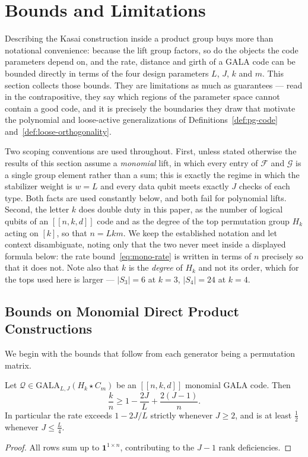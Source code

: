 \section{Bounds and Limitations}\label{sec:bounds}

Describing the Kasai construction inside a product group buys more than notational convenience: because the lift group factors, so do the objects the code parameters depend on, and the rate, distance and girth of a GALA code can be bounded directly in terms of the four design parameters $L$, $J$, $k$ and $m$. This section collects those bounds. They are limitations as much as guarantees --- read in the contrapositive, they say which regions of the parameter space cannot contain a good code, and it is precisely the boundaries they draw that motivate the polynomial and loose-active generalizations of Definitions~\ref{def:pg-code} and~\ref{def:loose-orthogonality}.

Two scoping conventions are used throughout. First, unless stated otherwise the results of this section assume a \emph{monomial} lift, in which every entry of $\mathcal F$ and $\mathcal G$ is a single group element rather than a sum; this is exactly the regime in which the stabilizer weight is $w = L$ and every data qubit meets exactly $J$ checks of each type. Both facts are used constantly below, and both fail for polynomial lifts. Second, the letter $k$ does double duty in this paper, as the number of logical qubits of an $[[n,k,d]]$ code and as the degree of the top permutation group $H_k$ acting on $[k]$, so that $n = Lkm$. We keep the established notation and let context disambiguate, noting only that the two never meet inside a displayed formula below: the rate bound~\eqref{eq:mono-rate} is written in terms of $n$ precisely so that it does not. Note also that $k$ is the \emph{degree} of $H_k$ and not its order, which for the tops used here is larger --- $|S_3| = 6$ at $k=3$, $|S_4| = 24$ at $k=4$.

\subsection{Bounds on Monomial Direct Product Constructions}\label{ssec:mono-bounds}

We begin with the bounds that follow from each generator being a permutation matrix.

\begin{proposition}\label{prop:rate-bound}
Let $\mathcal Q\in \mathrm{GALA}_{L,J}(H_k\star C_m)$ be an $[[n,k,d]]$ monomial GALA code. Then
\begin{equation}\label{eq:mono-rate}
    \frac{k}{n} \geq 1-\frac{2J}{L} + \frac{2(J-1)}{n}.
\end{equation}
In particular the rate exceeds $1-2J/L$ strictly whenever $J\geq2$, and is at least $\tfrac12$ whenever $J\leq \tfrac L4$.
\end{proposition}
\begin{proof}
    All rows sum up to $\textbf{1}^{1\times n}$, contributing to the $J-1$ rank deficiencies.     
\end{proof}


